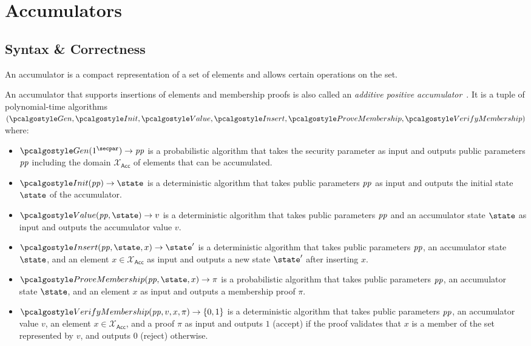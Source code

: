 \section{Accumulators}\label{sec:accumulators}

\subsection{Syntax \& Correctness}

An accumulator is a compact representation of a set of elements and allows certain operations on the set.

\begin{definition}[Accumulator]\label{def:accumulator}
An accumulator that supports insertions of elements and membership proofs is also called an \emph{additive positive accumulator}~\cite{RSA:BalCanYak20}.
It is a tuple of polynomial-time algorithms $(\algo{Gen}, \algo{Init}, \algo{Value}, \algo{Insert}, \algo{ProveMembership}, \algo{VerifyMembership})$ where:

\begin{itemize}
    \item $\algo{Gen}(1^\secpar) \rightarrow \params$ is a probabilistic algorithm that takes the security parameter as input and outputs public parameters $\mathit{pp}$ including the domain $\mathcal{X}_\mathsf{Acc}$ of elements that can be accumulated.
    \item $\algo{Init}(\params) \rightarrow \state$ is a deterministic algorithm that takes public parameters $\mathit{pp}$ as input and outputs the initial state $\state$ of the accumulator.
    \item $\algo{Value}(\params, \state) \rightarrow v$ is a deterministic algorithm that takes public parameters $\mathit{pp}$ and an accumulator state $\state$ as input and outputs the accumulator value $v$.
    \item $\algo{Insert}(\params, \state, x) \rightarrow \state'$ is a deterministic algorithm that takes public parameters $\mathit{pp}$, an accumulator state $\state$, and an element $x \in \mathcal{X}_\mathsf{Acc}$ as input and outputs a new state $\state'$ after inserting $x$.
    \item $\algo{ProveMembership}(\params, \state, x) \rightarrow \pi$ is a probabilistic algorithm that takes public parameters $\mathit{pp}$, an accumulator state $\state$, and an element $x$ as input and outputs a membership proof $\pi$.
    \item $\algo{VerifyMembership}(\params, v, x, \pi) \rightarrow \{0, 1\}$ is a deterministic algorithm that takes public parameters $\mathit{pp}$, an accumulator value $v$, an element $x \in \mathcal{X}_\mathsf{Acc}$, and a proof $\pi$ as input and outputs $1$ (accept) if the proof validates that $x$ is a member of the set represented by $v$, and outputs $0$ (reject) otherwise.
\end{itemize}
\end{definition}

